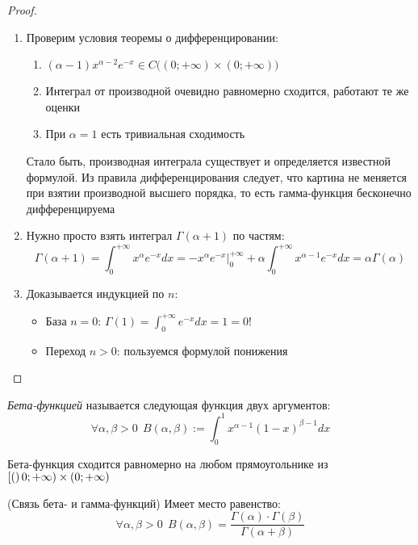 \begin{proof}~
	\begin{enumerate}
		\item Проверим условия теоремы о дифференцировании:
		\begin{enumerate}
			\item $(\alpha - 1)x^{\alpha - 2}e^{-x} \in C\big((0; +\infty) \times (0; +\infty)\big)$
			
			\item Интеграл от производной очевидно равномерно сходится, работают те же оценки
			
			\item При $\alpha = 1$ есть тривиальная сходимость
		\end{enumerate}
		Стало быть, производная интеграла существует и определяется известной формулой. Из правила дифференцирования следует, что картина не меняется при взятии производной высшего порядка, то есть гамма-функция бесконечно дифференцируема
		
		\item Нужно просто взять интеграл $\Gamma(\alpha + 1)$ по частям:
		\[
			\Gamma(\alpha + 1) = \int_0^{+\infty} x^\alpha e^{-x}dx = -x^\alpha e^{-x}\Big|_0^{+\infty} + \alpha \int_0^{+\infty} x^{\alpha - 1}e^{-x}dx = \alpha\Gamma(\alpha)
		\]
		
		\item Доказывается индукцией по $n$:
		\begin{itemize}
			\item База $n = 0$: $\Gamma(1) = \int_0^{+\infty} e^{-x}dx = 1 = 0!$
			
			\item Переход $n > 0$: пользуемся формулой понижения
		\end{itemize}
	\end{enumerate}
\end{proof}

\begin{definition}
	\textit{Бета-функцией} называется следующая функция двух аргументов:
	\[
		\forall \alpha, \beta > 0\ \ B(\alpha, \beta) := \int_0^1 x^{\alpha - 1}(1 - x)^{\beta - 1}dx
	\]
\end{definition}

\begin{proposition}
	Бета-функция сходится равномерно на любом прямоугольнике из $\left[(\right)0; +\infty) \times (0; +\infty)$
\end{proposition}

\begin{theorem} (Связь бета- и гамма-функций)
	Имеет место равенство:
	\[
		\forall \alpha, \beta > 0\ \ B(\alpha, \beta) = \frac{\Gamma(\alpha) \cdot \Gamma(\beta)}{\Gamma(\alpha + \beta)}
	\]
\end{theorem}

